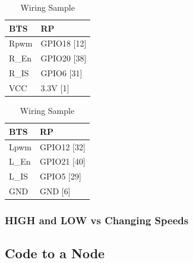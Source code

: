 \documentclass[a4paper, 10pt]{article}
\begin{document}
        \begin{table}[h]
        \centering
        \begin{minipage}{.35\linewidth}
        \centering
        \begin{tabular}{|l|l|}
        \hline
        \textbf{BTS} & \textbf{RP} \\
        \hline
        Rpwm & GPIO18 [12] \\
        \hline
        R\_En & GPIO20 [38] \\
        \hline
        R\_IS & GPIO6 [31] \\
        \hline
        VCC & 3.3V [1] \\
        \hline
        \end{tabular}
        \label{tab:right}
        \end{minipage}
        \begin{minipage}{.3\linewidth}
        \centering
        \begin{tabular}{|l|l|}
        \hline
        \textbf{BTS} & \textbf{RP} \\
        \hline
        Lpwm & GPIO12 [32] \\
        \hline
        L\_En & GPIO21 [40] \\
        \hline
        L\_IS & GPIO5 [29] \\
        \hline
        GND & GND [6] \\
        \hline
        \end{tabular}
        \label{tab:left}
        \end{minipage}
        \caption{Wiring Sample}
        \label{tab:pwm}
        \end{table}
        
        \subsubsection{HIGH and LOW vs Changing Speeds}
            
    \subsection{Code to a Node}
         
\end{document}
